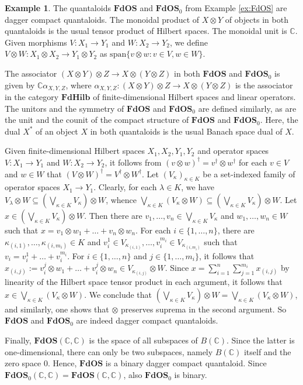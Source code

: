 \documentclass[12pt]{tac}
\theoremstyle{definition}
\newtheorem{example}[theorem]{Example}
\theoremstyle{remark}
\newcommand{\CC}{\mathbb C}
\newcommand{\<}{\langle}
\renewcommand{\>}{\rangle}
\renewcommand{\:}{\colon}
\begin{document}
\begin{example}\label{ex:FdOS-dagger-compact}
    The quantaloids $\mathbf{FdOS}$ and $\mathbf{FdOS}_0$ from Example \ref{ex:FdOS} are dagger compact quantaloids. The monoidal product of $X\otimes Y$ of objects in both quantaloids is the usual tensor product of Hilbert spaces. The monoidal unit is $\mathbb C$. Given morphisms $V:X_1\to Y_1$ and $W:X_2\to Y_2$, we define $V\otimes W:X_1\otimes X_2\to Y_1\otimes Y_2$ as $\mathrm{span}\{v\otimes w:v\in V,w\in W\}$. 

    The associator $(X\otimes Y)\otimes Z\to X\otimes (Y\otimes Z)$ in both $\mathbf{FdOS}$ and $\mathbf{FdOS}_0$ is given by $\CC\alpha_{X,Y,Z}$, where $\alpha_{X,Y,Z}:(X\otimes Y)\otimes Z\to X\otimes (Y\otimes Z)$ is the associator in the category $\mathbf{FdHilb}$ of finite-dimensional Hilbert spaces and linear operators. The unitors and the symmetry of $\mathbf{FdOS}$ and $\mathbf{FdOS}_0$ are defined similarly, as are the unit and the counit of the compact structure of $\mathbf{FdOS}$ and $\mathbf{FdOS}_0$. Here, the dual $X^*$ of an object $X$ in both quantaloids is the usual Banach space dual of $X$.

Given finite-dimensional Hilbert spaces $X_1,X_2,Y_1,Y_2$ and operator spaces $V:X_1\to Y_1$ and $W:X_2\to Y_2$, it follows from $(v\otimes w)^\dag=v^\dag\otimes w^\dag$ for each $v\in V$ and $w\in W$ that $(V\otimes W)^\dag=V^\dag\otimes W^\dag$.
  Let $(V_\kappa)_{\kappa\in K}$ be a set-indexed family of operator spaces $X_1\to Y_1$.
Clearly, for each $\lambda\in K$, we have $V_\lambda\otimes W\subseteq\left(\bigvee_{\kappa\in K}V_\kappa\right)\otimes W$, whence $\bigvee_{\kappa\in K}(V_\kappa\otimes W)\subseteq\left(\bigvee_{\kappa\in K}V_\kappa\right)\otimes W$. 
Let $x\in \left(\bigvee_{\kappa\in K}V_\kappa\right)\otimes W$. Then there are $v_1,\ldots,v_n\in \bigvee_{\kappa\in K}V_\kappa$ and $w_1,\ldots,w_n\in W$ such that $x=v_1\otimes w_1+\ldots+v_n\otimes w_n$. For each $i\in\{1,\ldots,n\}$, there are $\kappa_{(i,1)},\ldots,\kappa_{(i,m_i)}\in K$ and $v_i^1\in V_{\kappa_{(i,1)}},\ldots, v_i^{m_i}\in V_{\kappa_{(i,m_i)}}$ such that $v_i=v_i^1+\ldots+v_i^{m_i}$. For $i\in\{1,\ldots,n\}$ and $j\in\{1,\ldots,m_i\}$, it follows that $x_{(i,j)}:=v_i^{j}\otimes w_1+\ldots+ v_i^{j}\otimes w_n\in V_{\kappa_{(i,j)}}\otimes W$. 
Since $x=\sum_{i=1}^n\sum_{j=1}^{m_i}x_{(i,j)}$ by linearity of the Hilbert space tensor product in each argument, it follows that $x\in \bigvee_{\kappa\in K}(V_\kappa\otimes W)$. We conclude that $\left(\bigvee_{\kappa\in K}V_\kappa\right)\otimes W=\bigvee_{\kappa\in K}(V_\kappa\otimes W)$, 
and similarly, one shows that $\otimes$ preserves suprema in the second argument. So $\mathbf{FdOS}$ and $\mathbf{FdOS}_0$ are indeed dagger compact quantaloids.

Finally, $\mathbf{FdOS}(\CC,\CC)$ is the space of all subspaces of $B(\CC)$. Since the latter is one-dimensional, there can only be two subspaces, namely $B(\CC)$ itself and the zero space $0$. Hence, $\mathbf{FdOS}$ is a binary dagger compact quantaloid. Since $\mathbf{FdOS}_0(\CC,\CC)=\mathbf{FdOS}(\CC,\CC)$, also $\mathbf{FdOS}_0$ is binary. 
\end{example}
\end{document}
